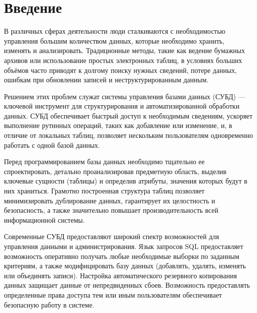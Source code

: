 

\section*{Введение}
В различных сферах деятельности люди сталкиваются с необходимостью управления большим количеством данных, которые необходимо хранить, изменять и анализировать. Традиционные методы, такие как ведение бумажных архивов или использование простых электронных таблиц, в условиях больших объёмов часто приводят к долгому поиску нужных сведений, потере данных, ошибкам при обновлении записей и неструктурированным данным.

Решением этих проблем служат системы управления базами данных (СУБД) --- ключевой инструмент для структурирования и автоматизированной обработки данных. СУБД обеспечивает быстрый доступ к необходимым сведениям, ускоряет выполнение рутинных операций, таких как добавление или изменение, и, в отличие от локальных таблиц, позволяет нескольким пользователям одновременно работать с одной базой данных.

Перед программированием базы данных необходимо тщательно ее спроектировать, детально проанализировав предметную область, выделив ключевые сущности (таблицы) и определив атрибуты, значения которых будут в них храниться. Грамотно построенная структура таблиц позволяет минимизировать дублирование данных, гарантирует их целостность и безопасность, а также значительно повышает производительность всей информационной системы.

Современные СУБД предоставляют широкий спектр возможностей для управления данными и администрирования. Язык запросов SQL предоставляет возможность оперативно получать любые необходимые выборки по заданным критериям, а также модифицировать базу данных (добавлять, удалять, изменять или объединять записи). Настройка автоматического резервного копирования данных защищает данные от непредвиденных сбоев. Возможность предоставлять определенные права доступа тем или иным пользователям обеспечивает безопасную работу в системе.